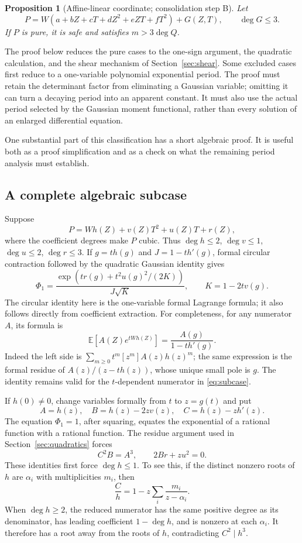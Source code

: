 \documentclass[11pt]{article}
\newtheorem{proposition}[theorem]{Proposition}
\theoremstyle{definition}\newtheorem{definition}[theorem]{Definition}
\theoremstyle{remark}\newtheorem{remark}[theorem]{Remark}
\newcommand{\E}{\mathbb E}
\begin{document}
\begin{proposition}[Affine-linear coordinate; consolidation step B]\label{prop:wlinear}
Let
\[
 P=W(a+bZ+cT+dZ^2+eZT+fT^2)+G(Z,T),\qquad\deg G\leq3.
\]
If $P$ is pure, it is safe and satisfies $m>3\deg Q$.
\end{proposition}

The proof below reduces the pure cases to the one-sign argument,
the quadratic calculation, and the shear mechanism of
Section~\ref{sec:shear}. Some excluded cases first reduce to a
one-variable polynomial exponential period. The proof must retain
the determinant factor from eliminating a Gaussian variable; omitting
it can turn a decaying period into an apparent constant. It must also
use the actual period selected by the Gaussian moment functional,
rather than every solution of an enlarged differential equation.

One substantial part of this classification has a short algebraic proof.
It is useful both as a proof simplification and as a check on what the
remaining period analysis must establish.

\subsection{A complete algebraic subcase}\label{sec:algebraic}
Suppose
\[
 P=W h(Z)+v(Z)T^2+u(Z)T+r(Z),
\]
where the coefficient degrees make $P$ cubic. Thus
$\deg h\leq2$, $\deg v\leq1$, $\deg u\leq2$, $\deg r\leq3$.
If $g=th(g)$ and $J=1-th'(g)$, formal circular contraction followed
by the quadratic Gaussian identity gives
\begin{equation}\label{eq:subcase}
 \Phi_1=
 \frac{\exp\!\left(tr(g)+t^2u(g)^2/(2K)\right)}{J\sqrt K},
 \qquad K=1-2tv(g).
\end{equation}
The circular identity here is the one-variable formal Lagrange formula;
it also follows directly from coefficient extraction. For completeness,
for any numerator $A$, its formula is
\[
 \E[A(Z)e^{tWh(Z)}]=\frac{A(g)}{1-th'(g)}.
\]
Indeed the left side is $\sum_{m\geq0}t^m[z^m]A(z)h(z)^m$;
the same expression is the formal residue of $A(z)/(z-th(z))$,
whose unique small pole is $g$. The identity remains valid for the
$t$-dependent numerator in \eqref{eq:subcase}.

If $h(0)\ne0$, change variables formally from $t$ to $z=g(t)$ and put
\[
 A=h(z),\quad B=h(z)-2zv(z),\quad C=h(z)-zh'(z).
\]
The equation $\Phi_1=1$, after squaring, equates the exponential of a
rational function with a rational function. The residue argument used
in Section~\ref{sec:quadratics} forces
\begin{equation}\label{eq:subcaseidentities}
 C^2B=A^3,\qquad 2Br+zu^2=0.
\end{equation}
These identities first force $\deg h\leq1$. To see this, if the distinct
nonzero roots of $h$ are $\alpha_i$ with multiplicities $m_i$, then
\[
 \frac Ch=1-z\sum_i\frac{m_i}{z-\alpha_i}.
\]
When $\deg h\geq2$, the reduced numerator has the same positive degree
as its denominator, has leading coefficient $1-\deg h$, and is nonzero
at each $\alpha_i$. It therefore has a root away from the roots of $h$,
contradicting $C^2\mid h^3$.
\end{document}
